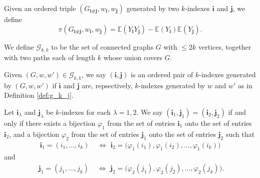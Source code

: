 


\begin{definition}
  \notready
  \label{def:common_val_prod_of}
  Given an ordered triple $(G_{\mathbf{i}\#\mathbf{j}},w_\mathbf{i},w_\mathbf{j})$ generated by two $k$-indexes $\mathbf{i}$ and $\mathbf{j}$, we define
  \[
  \pi(G_{\mathbf{i}\#\mathbf{j}},w_\mathbf{i},w_\mathbf{j}) = \mathbb{E}(Y_\mathbf{i} Y_\mathbf{j}) - \mathbb{E}(Y_\mathbf{i}) \mathbb{E}(Y_\mathbf{j}).
  \]
\end{definition}
\begin{definition}
  \notready
  \label{def:graph_walk_triple_set}
  \uses{} %
  We define $\mathcal{G}_{k,k}$ to be the set of connected graphs $G$ with $\leq 2k$ vertices, 
  together with two paths each of length $k$ whose union covers $G$.
\end{definition}
\begin{definition}
  \notready
  \label{def:index_pair}
  Given $(G,w,w') \in \mathcal{G}_{k,k}$, we say $(\mathbf{i},\mathbf{j})$ is an ordered pair of $k$-indexes generated by $(G,w,w')$ 
  if $\mathbf{i}$ and $\mathbf{j}$ are, repsectively, $k$-indexes generated by $w$ and $w'$ as in Definition \ref{def:g_k_j}.
\end{definition}
\begin{definition}
  \notready
  \label{def:index_pair_rel}
  \uses{} %
  Let $\mathbf{i}_\lambda$ and $\mathbf{j}_\lambda$ be $k$-indexes for each $\lambda=1,2$. We say $(\mathbf{i}_1,\mathbf{j}_1) = (\mathbf{i}_2,\mathbf{j}_2)$ if and only if there exists a bijection $\varphi_1$ from the set of entries $\mathbf{i}_1$ onto the set of entries $\mathbf{i}_2$, 
  and a bijection $\varphi_2$ from the set of entries $\mathbf{j}_1$ onto the set of entries $\mathbf{j}_2$ such that
  \begin{equation}
  \begin{split}
    \mathbf{i}_1 = (i_1,...,i_k) & \,\, \Longleftrightarrow \,\, \mathbf{i}_2 = \bigl( \varphi_1(i_1),\varphi_1(i_2),...,\varphi_1(i_k) \bigl)
  \end{split}
  \end{equation}
  and
  \begin{equation}
  \begin{split}
    \phantom{.}\mathbf{j}_1 = (j_1,...,j_k) & \,\, \Longleftrightarrow \,\, \mathbf{j}_2 = \bigl( \varphi_2(j_1),\varphi_2(j_2),...,\varphi_2(j_k) \bigl).
  \end{split}
  \end{equation}
\end{definition}

